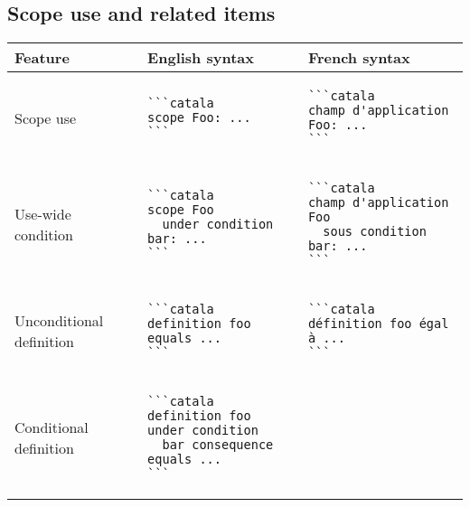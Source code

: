 \documentclass[a3paper,landscape]{article}
\begin{document}
\begin{multicols*}{2}
\section*{Scope use and related items}
\begin{center}
\begin{tabular}{p{}p{}p{}}
\toprule
Feature&English syntax&French syntax\\\midrule
Scope use&
\vspace*{-1.75em}
\begin{verbatim}
```catala
scope Foo: ...
```
\end{verbatim}
\vspace*{-1.75em}
&
\vspace*{-1.75em}
\begin{verbatim}
```catala
champ d'application Foo: ...
```
\end{verbatim}
\vspace*{-1.75em}
\\
Use-wide condition&
\vspace*{-1.75em}
\begin{verbatim}
```catala
scope Foo
  under condition bar: ...
```
\end{verbatim}
\vspace*{-1.75em}
&
\vspace*{-1.75em}
\begin{verbatim}
```catala
champ d'application Foo
  sous condition bar: ...
```
\end{verbatim}
\vspace*{-1.75em}
\\
Unconditional definition&
\vspace*{-1.75em}
\begin{verbatim}
```catala
definition foo equals ...
```
\end{verbatim}
\vspace*{-1.75em}
&
\vspace*{-1.75em}
\begin{verbatim}
```catala
définition foo égal à ...
```
\end{verbatim}
\vspace*{-1.75em}
\\
Conditional definition&
\vspace*{-1.75em}
\begin{verbatim}
```catala
definition foo under condition
  bar consequence equals ...
```
\end{verbatim}

\end{tabular}
\end{center}
\end{multicols*}
\end{document}
